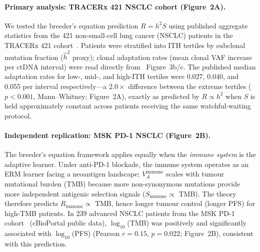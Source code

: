 \documentclass[12pt]{article}
\theoremstyle{remark}
\begin{document}
\paragraph{Primary analysis: TRACERx 421 NSCLC cohort (Figure~2A).} We tested the breeder's equation prediction $R = h^2 S$ using published aggregate statistics from the 421 non-small-cell lung cancer (NSCLC) patients in the TRACERx 421 cohort~\cite{jamal2023,abbosh2023}. Patients were stratified into ITH tertiles by subclonal mutation fraction ($\hat{h}^2$ proxy); clonal adaptation rates (mean clonal VAF increase per ctDNA interval) were read directly from~\cite{abbosh2023} Figure~3b/c. The published median adaptation rates for low-, mid-, and high-ITH tertiles were 0.027, 0.040, and 0.055 per interval respectively---a $2.0\times$ difference between the extreme tertiles ($p < 0.001$, Mann--Whitney; Figure~2A), exactly as predicted by $R \propto h^2$ when $S$ is held approximately constant across patients receiving the same watchful-waiting protocol.

\paragraph{Independent replication: MSK PD-1 NSCLC (Figure~2B).} The breeder's equation framework applies equally when the \emph{immune system} is the adaptive learner. Under anti-PD-1 blockade, the immune system operates as an ERM learner facing a neoantigen landscape; $V_A^{\mathrm{immune}}$ scales with tumour mutational burden (TMB) because more non-synonymous mutations provide more independent antigenic selection signals ($S_{\mathrm{immune}} \propto$ TMB). The theory therefore predicts $R_{\mathrm{immune}} \propto$ TMB, hence longer tumour control (longer PFS) for high-TMB patients. In 239 advanced NSCLC patients from the MSK PD-1 cohort~\cite{hellmann2018} (cBioPortal public data), $\log_{10}$(TMB) was positively and significantly associated with $\log_{10}$(PFS) (Pearson $r = 0.15$, $p = 0.022$; Figure~2B), consistent with this prediction.
\end{document}
